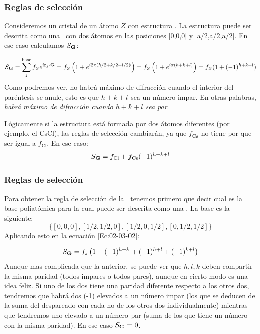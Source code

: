 \subsubsection{Reglas de selección \bcc}

Consideremos un cristal de un átomo $Z$ con estructura \bcc. La estructura \bcc puede ser descrita como una \sc \ con dos átomos en las posiciones [0,0,0] y [a/2,a/2,a/2]. En ese caso calculamos $S_{\mathbf{G}}$:

\begin{equation*}
	S_{\mathbf{G}} = \sum_{j}^{\text{base}} f_Z e^{i \mathbf{r}_j \cdot \mathbf{G}}  = f_Z \left( 1+e^{i 2 \pi (h/2+k/2+l/2)}  \right) =  f_Z \left( 1+e^{i \pi (h+k+l)}  \right) = f_Z (1+(-1)^{h+k+l})
\end{equation*}
Como podremos ver, no habrá máximo de difracción cuando el interior del paréntesis se anule, esto es que $h+k+l$ sea un número impar. En otras palabras, \textit{habrá máximo de difracción cuando $h+k+l$ sea par}. 

Lógicamente si la estructura está formada por dos átomos diferentes (por ejemplo, el CsCl), las reglas de selección cambiarán, ya que $f_{\textbf{Cs}}$ no tiene por que ser igual a $f_{\text{Cl}}$. En ese caso:
\begin{equation*}
	S_{\mathbf{G}} = f_{\text{Cl}} + f_{\text{Cs}}(-1)^{h+k+l}
\end{equation*}


\subsubsection{Reglas de selección \fcc}

Para obtener la regla de selección de la \fcc \ tenemos primero que decir cual es la base poliatómica para la cual puede ser descrita como una \sc. La base es la siguiente: $$\{[0,0,0],[1/2,1/2,0],[1/2,0,1/2],[0,1/2,1/2]\}$$ Aplicando esto en la ecuación \ref{Ec:02-03-02}:

 
\begin{equation*}
 	S_{\mathbf{G}} = f_z \left( 1+(-1)^{h+k}+(-1)^{h+l}+(-1)^{k+l} \right) 
\end{equation*}
Aunque mas complicada que la anterior, se puede ver que $h,l,k$ deben compartir la misma paridad (todos impares o todos pares), aunque en cierto modo es una idea feliz. Si uno de los dos tiene una paridad diferente respecto a los otros dos, tendremos que habrá dos (-1) elevados a un número impar (los que se deducen de la suma del despareado con cada no de los otros dos individualmente) mientras que tendremos uno elevado a un número par (suma de los que tiene un número con la misma paridad). En ese caso $S_{\mathbf{G}} =0$. 


